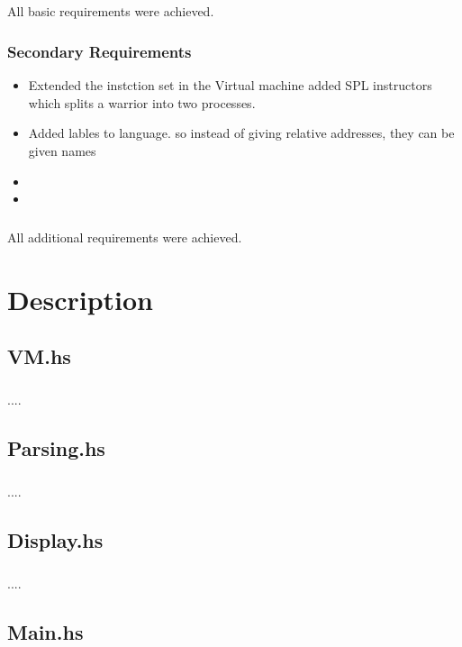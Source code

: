 \documentclass{report}
\begin{document}
			\paragraph{}All basic requirements were achieved.
			
			\subsection{Secondary Requirements}
			\begin{itemize}
			\item Extended the instction set in the Virtual machine added SPL instructors which splits a warrior into two processes. 
			\item Added lables to language. so instead of giving relative addresses, they can be given names
			\item 
			\item 
		
			
			\end{itemize}
			\paragraph{}All additional requirements were achieved.

\chapter{Description}
		\section{VM.hs}
			\paragraph{}....
		\section{Parsing.hs}
			\paragraph{}....
		\section{Display.hs}
			\paragraph{}....
		\section{Main.hs}
\end{document}
